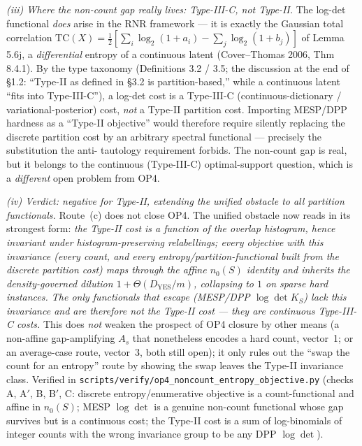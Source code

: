 \documentclass[
]{article}
\begin{document}
\emph{(iii) Where the non-count gap really lives: Type-III-C, not Type-II.}
The log-det functional \emph{does} arise in the RNR framework --- it is
exactly the Gaussian total correlation $\mathrm{TC}(X)=\tfrac12[\sum_i
\log_2(1+a_i)-\sum_j\log_2(1+b_j)]$ of Lemma 5.6j, a \emph{differential}
entropy of a continuous latent (Cover--Thomas 2006, Thm 8.4.1). By the
type taxonomy (Definitions 3.2 / 3.5; the discussion at the end of \S 1.2:
``Type-II as defined in \S 3.2 is partition-based,'' while a continuous
latent ``fits into Type-III-C''), a log-det cost is a Type-III-C
(continuous-dictionary / variational-posterior) cost, \emph{not} a Type-II
partition cost. Importing MESP/DPP hardness as a ``Type-II objective''
would therefore require silently replacing the discrete partition cost by an
arbitrary spectral functional --- precisely the substitution the anti-
tautology requirement forbids. The non-count gap is real, but it belongs to
the continuous (Type-III-C) optimal-support question, which is a
\emph{different} open problem from OP4.

\emph{(iv) Verdict: negative for Type-II, extending the unified obstacle to
all partition functionals.} Route~(c) does not close OP4. The unified
obstacle now reads in its strongest form: \emph{the Type-II cost is a
function of the overlap histogram, hence invariant under
histogram-preserving relabellings; every objective with this invariance
(every count, and every entropy/partition-functional built from the
discrete partition cost) maps through the affine $n_0(S)$ identity and
inherits the density-governed dilution $1+\Theta(D_{\mathrm{YES}}/m)$,
collapsing to $1$ on sparse hard instances. The only functionals that
escape (MESP/DPP $\log\det K_S$) lack this invariance and are therefore not
the Type-II cost --- they are continuous Type-III-C costs.} This does
\emph{not} weaken the prospect of OP4 closure by other means (a non-affine
gap-amplifying $A_s$ that nonetheless encodes a hard count, vector~1; or an
average-case route, vector~3, both still open); it only rules out the
``swap the count for an entropy'' route by showing the swap leaves the
Type-II invariance class. Verified in
\texttt{scripts/verify/op4\_noncount\_entropy\_objective.py} (checks A, A$'$,
B, B$'$, C: discrete entropy/enumerative objective is a count-functional and
affine in $n_0(S)$; MESP $\log\det$ is a genuine non-count functional whose
gap survives but is a continuous cost; the Type-II cost is a sum of
log-binomials of integer counts with the wrong invariance group to be any
DPP $\log\det$).
\end{document}
